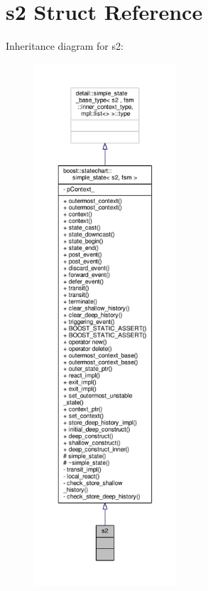 \hypertarget{structs2}{}\section{s2 Struct Reference}
\label{structs2}


Inheritance diagram for s2\+:
\nopagebreak
\begin{figure}[H]
\begin{center}
\leavevmode
\includegraphics[height=550pt]{structs2__inherit__graph}
\end{center}
\end{figure}



